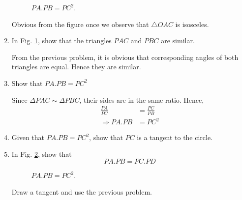 \begin{enumerate}[label=\arabic*.,ref=\thesubsection.\theenumi]
	\begin{figure}[!ht]
		\begin{center}
			
			\resizebox{\columnwidth}{!}{}
		\end{center}
		\caption{$PA.PB = PC^2$.}
		\label{ch4_tangent_prod}	
	\end{figure}

%
\solution Obvious from the figure once we observe that $\triangle OAC$ is isosceles.
%
%
\item
	In Fig. \ref{ch4_tangent_prod}, show that the triangles $PAC$ and $PBC$ are similar.

\solution From the previous problem, it is obvious that corresponding angles of both triangles are equal.  Hence they are similar.
%
\item
	Show that $PA.PB = PC^2$

\solution Since $\Delta PAC \sim \Delta PBC$, their sides are in the same ratio.  Hence,
%
\begin{align}
\frac{PA}{PC} &= \frac{PC}{PB} \\
\Rightarrow PA.PB &=PC^2
\end{align}
%
\item
Given that $PA.PB = PC^2$, show that $PC$ is a tangent to the circle.

%
\item
	In Fig. \ref{ch4_chord_tangent_prod}, show that\begin{equation}
	PA.PB = PC.PD
	\end{equation}

%
\begin{figure}[!ht]
	\begin{center}
		
		\resizebox{\columnwidth}{!}{}
	\end{center}
	\caption{$PA.PB = PC^2$.}
	\label{ch4_chord_tangent_prod}	
\end{figure}

\solution Draw a tangent and use the previous problem.
\end{enumerate}
